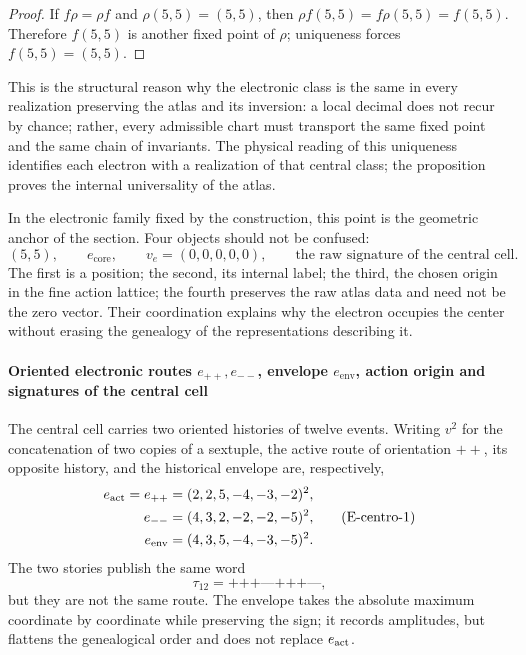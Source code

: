 \begin{proof}
If \(f\rho=\rho f\) and \(\rho(5,5)=(5,5)\), then
\(\rho f(5,5)=f\rho(5,5)=f(5,5)\). Therefore \(f(5,5)\) is another fixed point
of \(\rho\); uniqueness forces \(f(5,5)=(5,5)\).
\end{proof}

This is the structural reason why the electronic class is the same in
every realization preserving the atlas and its inversion: a local decimal does not
recur by chance; rather, every admissible chart must
transport the same fixed point and the same chain of invariants. The
physical reading of this uniqueness identifies each electron with a realization of that
central class; the proposition proves the internal universality of the atlas.

In the electronic family fixed by the construction, this point is the geometric
anchor of the section. Four objects should not be confused:
\[
 (5,5),\qquad
 e_{\mathrm{core}},\qquad
 v_e=(0,0,0,0,0),\qquad
 \text{the raw signature of the central cell}.
\]
The first is a position; the second, its internal label; the third,
the chosen origin in the fine action lattice; the fourth preserves the
raw atlas data and need not be the zero vector. Their
coordination explains why the electron occupies the center without erasing the
genealogy of the representations describing it.

\paragraph{Oriented electronic routes \(e_{++},e_{--}\), envelope \(e_{\mathrm{env}}\), action origin and signatures of the central cell}
The central cell carries two oriented histories of twelve events. Writing
\(v^2\) for the concatenation of two copies of a sextuple, the active
route of orientation \({++}\), its opposite history, and the historical
envelope are, respectively,
\[
\begin{aligned}
 e_{\rm act}=e_{++}
   &=(2,2,5,-4,-3,-2)^2,\\
 e_{--}
   &=(4,3,2,-2,-2,-5)^2,\\
 e_{\rm env}
   &=(4,3,5,-4,-3,-5)^2.
\end{aligned}
\tag{E-centro-1}\label{p12-83-c15-s2:eq:electron-rutas-finas-rev8}
\]
The two stories publish the same word
\[
 \tau_{12}=\texttt{+++---+++---},
\]
but they are not the same route. The envelope takes the absolute maximum
coordinate by coordinate while preserving the sign; it records amplitudes, but
flattens the genealogical order and does not replace \(e_{\rm act}\).

